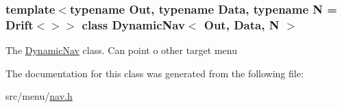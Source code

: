 \subsubsection*{template$<$typename Out, typename Data, typename N = Drift$<$$>$$>$\newline
class Dynamic\+Nav$<$ Out, Data, N $>$}

The \hyperlink{classDynamicNav}{Dynamic\+Nav} class. Can point o other target menu 

The documentation for this class was generated from the following file\+:\begin{DoxyCompactItemize}
\item 
src/menu/\hyperlink{nav_8h}{nav.\+h}\end{DoxyCompactItemize}
